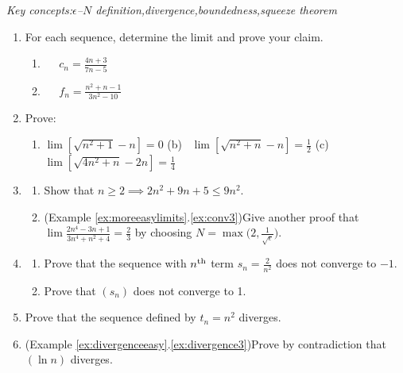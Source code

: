 \begin{exercises}{}{}
	\emph{Key concepts:\quad $\epsilon$--$N$ definition,\qquad divergence,\qquad boundedness,\qquad squeeze theorem}

	\begin{enumerate}
	  \item For each sequence, determine the limit and prove your claim.
	  \begin{enumerate}
	    \item{} \ 
	     \ 
	    $c_n=\frac{4n+3}{7n-5}$
	    \setcounter{enumii}{3}
	    \item{} \ 
	     \ 
	    $f_n=\frac{n^2+n-1}{3n^2-10}$
	  \end{enumerate}
	
	 
	  \item%
	  Prove:
	  \begin{enumerate}
		  \item $\lim[\sqrt{n^2+1}-n]=0$ \qquad
		  (b) \ $\lim[\sqrt{n^2+n}-n]=\frac 12$\qquad 
		  (c) \ $\lim[\sqrt{4n^2+n}-2n]=\frac 14$
	  \end{enumerate}
	  
	    
	  \item\label{exs:conv23again}
	  \begin{enumerate}
	    \item Show that $n\ge 2\implies 2n^2+9n+5\le 9n^2$.
	    \item (Example \ref*{ex:moreeasylimits}.\ref{ex:conv3})\lstsp Give another proof that $\lim \frac{2n^4-3n+1}{3n^4+n^2+4}=\frac 23$ by choosing $N=\max\bigl(2,\frac 1{\sqrt\epsilon}\bigr)$.
	 	\end{enumerate}
		 	
	 	
	  \item\begin{enumerate}
	   	\item Prove that the sequence with $n\textsuperscript{th}$ term $s_n=\frac 2{n^2}$ does not converge to $-1$.
			\item Prove that $(s_n)$ does not converge to 1.
		\end{enumerate}
	    
	    
	  \item Prove that the sequence defined by $t_n=n^2$ diverges.
	  
	 	
	 	\item (Example \ref*{ex:divergenceeasy}.\ref{ex:divergence3})\lstsp Prove by contradiction that $(\ln n)$ diverges.
	 	

\end{enumerate}
\end{exercises}
